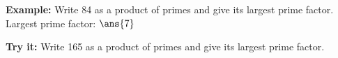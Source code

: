 \documentclass[12pt]{article}
\begin{document}
\begin{examplebox}
\textbf{Example:} \quad Write 84 as a product of primes and give its largest prime factor.
Largest prime factor: $\ans{7}$
\end{examplebox}

\begin{tryitbox}
\textbf{Try it:} \quad Write 165 as a product of primes and give its largest prime factor.\\[2pt]
\end{tryitbox}
\end{document}
